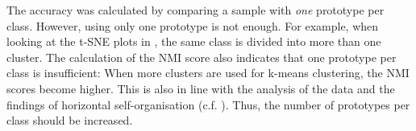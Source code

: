 The accuracy was calculated by comparing a sample with \emph{one} prototype per class. However, using only one prototype is not enough. For example, when looking at the t-SNE plots in , the same class is divided into more than one cluster. The calculation of the NMI score also indicates that one prototype per class is insufficient: When more clusters are used for k-means clustering, the NMI scores become higher. This is also in line with the analysis of the data and the findings of horizontal self-organisation (c.f. ). Thus, the number of prototypes per class should be increased.






